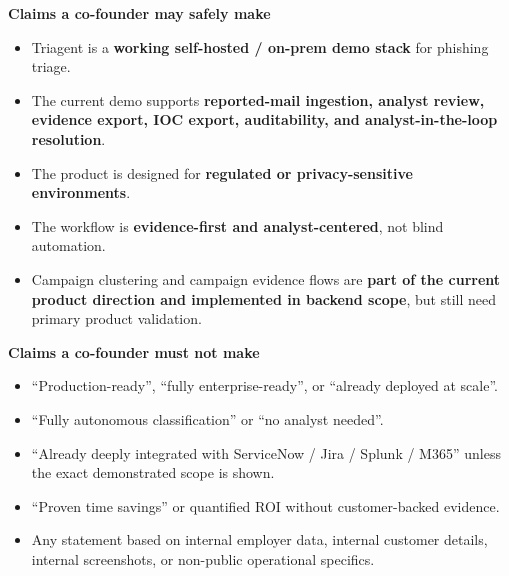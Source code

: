 \documentclass[10pt,a4paper]{article}
\begin{document}
\noindent\textbf{Claims a co-founder may safely make}
\begin{itemize}
  \item Triagent is a \textbf{working self-hosted / on-prem demo stack} for phishing triage.
  \item The current demo supports \textbf{reported-mail ingestion, analyst review, evidence export, IOC export, auditability, and analyst-in-the-loop resolution}.
  \item The product is designed for \textbf{regulated or privacy-sensitive environments}.
  \item The workflow is \textbf{evidence-first and analyst-centered}, not blind automation.
  \item Campaign clustering and campaign evidence flows are \textbf{part of the current product direction and implemented in backend scope}, but still need primary product validation.
\end{itemize}

\noindent\textbf{Claims a co-founder must not make}
\begin{itemize}
  \item ``Production-ready'', ``fully enterprise-ready'', or ``already deployed at scale''.
  \item ``Fully autonomous classification'' or ``no analyst needed''.
  \item ``Already deeply integrated with ServiceNow / Jira / Splunk / M365'' unless the exact demonstrated scope is shown.
  \item ``Proven time savings'' or quantified ROI without customer-backed evidence.
  \item Any statement based on internal employer data, internal customer details, internal screenshots, or non-public operational specifics.
\end{itemize}
\end{document}
